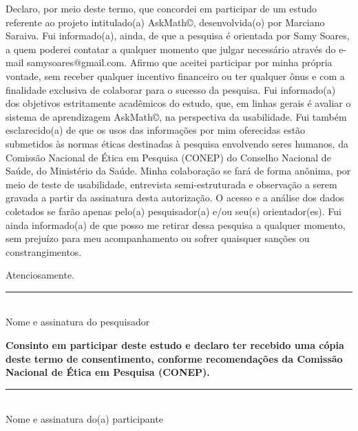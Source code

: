 \label{ap:tcle}

Declaro, por meio deste termo, que concordei em participar de um estudo referente ao projeto intitulado(a) AskMath\copyright, desenvolvida(o) por Marciano Saraiva. Fui informado(a), ainda, de que a pesquisa é orientada por Samy Soares, a quem poderei contatar a qualquer momento que julgar necessário através do  e-mail samysoares@gmail.com. Afirmo que aceitei participar por minha própria vontade, sem receber qualquer incentivo financeiro ou ter qualquer ônus e com a finalidade exclusiva de colaborar para o sucesso da pesquisa. Fui informado(a) dos objetivos estritamente acadêmicos do estudo, que, em linhas gerais é avaliar o sistema de aprendizagem AskMath\copyright, na perspectiva da usabilidade. Fui também esclarecido(a) de que os usos das informações por mim oferecidas estão submetidos às normas éticas destinadas à pesquisa envolvendo seres humanos, da Comissão Nacional de Ética em Pesquisa (CONEP) do Conselho Nacional de Saúde, do Ministério da Saúde. Minha colaboração se fará de forma anônima, por meio de teste de usabilidade, entrevista semi-estruturada e observação a serem gravada a partir da assinatura desta autorização. O acesso e a análise dos dados coletados se farão apenas pelo(a) pesquisador(a) e/ou seu(s) orientador(es). Fui ainda informado(a) de que posso me retirar dessa pesquisa a qualquer momento, sem prejuízo para meu acompanhamento ou sofrer quaisquer sanções ou constrangimentos. 

\begin{center}
	Atenciosamente.
\end{center}

\begin{center}
\noindent\rule{10cm}{0.4pt}\\
Nome e assinatura do pesquisador
\end{center}

\textbf{Consinto em participar deste estudo e declaro ter recebido uma cópia deste termo de consentimento, conforme recomendações da Comissão Nacional de Ética em Pesquisa (CONEP).}

\begin{center}
\noindent\rule{10cm}{0.4pt}\\
 Nome e assinatura do(a) participante
\end{center}


